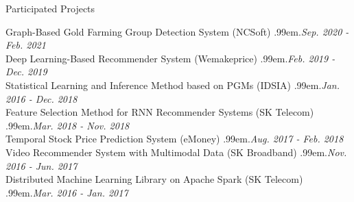 \documentclass{resume} %
\makeatletter
\newcommand \Dotfill {\leavevmode \cleaders \hb@xt@ .99em{\hss .\hss }\hfill \kern \z@}
\makeatother
\begin{document}
\begin{rSection}{Participated Projects}

Graph-Based Gold Farming Group Detection System (NCSoft) \smallskip \Dotfill \emph{Sep. 2020 - Feb. 2021} \\ 
Deep Learning-Based Recommender System (Wemakeprice) \smallskip \Dotfill \emph{Feb. 2019 - Dec. 2019} \\ 
Statistical Learning and Inference Method based on PGMs (IDSIA) \smallskip \Dotfill \emph{Jan. 2016 - Dec. 2018} \\ 
Feature Selection Method for RNN Recommender Systems (SK Telecom) \smallskip \Dotfill \emph{Mar. 2018 - Nov. 2018} \\ 
Temporal Stock Price Prediction System (eMoney) \smallskip \Dotfill \emph{Aug. 2017 - Feb. 2018} \\ 
Video Recommender System with Multimodal Data (SK Broadband) \smallskip \Dotfill \emph{Nov. 2016 - Jun. 2017} \\ 
Distributed Machine Learning Library on Apache Spark (SK Telecom) \smallskip \Dotfill \emph{Mar. 2016 - Jan. 2017}

\end{rSection}

\end{document}
